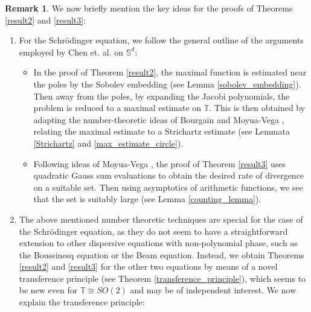 \documentclass[12pt]{amsart}
\theoremstyle{definition}
\newtheorem{remark}[theorem]{Remark}
\newcommand{\Sb}{\mathbb S}%
\newcommand{\T}{\mathbb T}%
\numberwithin{equation}{section}
\begin{document}
\begin{remark} \label{remark_results2_3_key_ideas}
We now briefly mention the key ideas for the proofs of Theorems \ref{result2} and \ref{result3}:
\begin{enumerate}
\item For the Schr\"odinger equation, we follow the general outline of the arguments employed by Chen et. al. on $\Sb^d$:
\begin{itemize}
\item[(a)] In the proof of Theorem \ref{result2}, the maximal function is estimated near the poles by the Sobolev embedding (see Lemma \ref{sobolev_embedding}). Then away from the poles, by expanding the Jacobi polynomials, the problem is reduced to a maximal estimate on $\T$. This is then obtained by adapting the number-theoretic ideas of Bourgain \cite{Bourgain-GAFA} and Moyua-Vega \cite{MV}, relating the maximal estimate to a Strichartz estimate (see Lemmata \ref{Strichartz} and \ref{max_estimate_circle}).
\item[(b)] Following ideas of Moyua-Vega \cite{MV}, the proof of Theorem \ref{result3} uses quadratic Gauss sum evaluations to obtain the desired rate of divergence on a suitable set. Then using asymptotics of arithmetic functions, we see that the set is suitably large (see Lemma \ref{counting_lemma}).
\end{itemize}
\item The above mentioned number theoretic techniques are special for the case of the Schr\"odinger equation, as they do not seem to have a straightforward extension to other dispersive equations with non-polynomial phase, such as the Boussinesq equation or the Beam equation. Instead, we obtain Theorems \ref{result2} and \ref{result3} for the other two equations by means of a novel transference principle (see Theorem \ref{transference_principle}), which seems to be new even for $\T \cong SO(2)$ and may be of independent interest. We now explain the transference principle:
\end{enumerate}
\end{remark}
\end{document}
